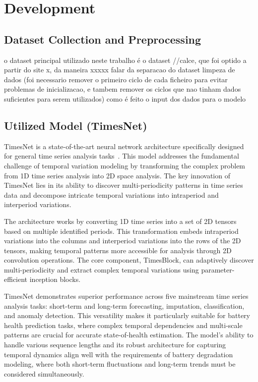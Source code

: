 \chapter{Development}
\label{ch:Development}
\lipsum[1]
\section{Dataset Collection and Preprocessing}

o dataset principal utilizado neste trabalho é o dataset //calce, que foi optido a partir do site x, da maneira xxxxx
falar da separacao do dataset
limpeza de dados (foi necessario remover o primeiro ciclo de cada ficheiro para  evitar problemas de inicializacao, e tambem remover os ciclos que nao tinham dados suficientes para serem utilizados)
como é feito o input dos dados para o modelo





\section{Utilized Model (TimesNet)}

TimesNet is a state-of-the-art neural network architecture specifically designed for general time series analysis tasks~\cite{wu_timesnet_2023}. This model addresses the fundamental challenge of temporal variation modeling by transforming the complex problem from 1D time series analysis into 2D space analysis. The key innovation of TimesNet lies in its ability to discover multi-periodicity patterns in time series data and decompose intricate temporal variations into intraperiod and interperiod variations.

The architecture works by converting 1D time series into a set of 2D tensors based on multiple identified periods. This transformation embeds intraperiod variations into the columns and interperiod variations into the rows of the 2D tensors, making temporal patterns more accessible for analysis through 2D convolution operations. The core component, TimesBlock, can adaptively discover multi-periodicity and extract complex temporal variations using parameter-efficient inception blocks.

TimesNet demonstrates superior performance across five mainstream time series analysis tasks: short-term and long-term forecasting, imputation, classification, and anomaly detection. This versatility makes it particularly suitable for battery health prediction tasks, where complex temporal dependencies and multi-scale patterns are crucial for accurate state-of-health estimation. The model's ability to handle various sequence lengths and its robust architecture for capturing temporal dynamics align well with the requirements of battery degradation modeling, where both short-term fluctuations and long-term trends must be considered simultaneously.

